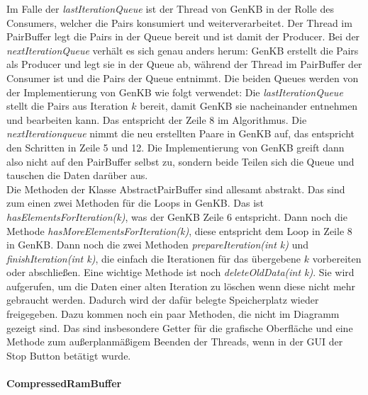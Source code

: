 \documentclass[12pt,a4paper]{article}
\begin{document}
Im Falle der \textit{lastIterationQueue} ist der Thread von GenKB in der Rolle des Consumers, welcher die Pairs konsumiert und weiterverarbeitet. Der Thread im PairBuffer legt die Pairs in der Queue bereit und ist damit der Producer. Bei der \textit{nextIterationQueue} verhält es sich genau anders herum: GenKB erstellt die Pairs als Producer und legt sie in der Queue ab, während der Thread im PairBuffer der Consumer ist und die Pairs der Queue entnimmt. Die beiden Queues werden von der Implementierung von GenKB wie folgt verwendet: Die \textit{lastIterationQueue} stellt die Pairs aus Iteration $k$ bereit, damit GenKB sie nacheinander entnehmen und bearbeiten kann. Das entspricht der Zeile 8 im Algorithmus. Die \textit{nextIterationqueue} nimmt die neu erstellten Paare in GenKB auf, das entspricht den Schritten in Zeile 5 und 12. Die Implementierung von GenKB greift dann also nicht auf den PairBuffer selbst zu, sondern beide Teilen sich die Queue und tauschen die Daten darüber aus. \\
Die Methoden der Klasse AbstractPairBuffer sind allesamt abstrakt. Das sind zum einen zwei Methoden für die Loops in GenKB. Das ist \textit{hasElementsForIteration(k)}, was der GenKB Zeile 6 entspricht. Dann noch die Methode \textit{hasMoreElementsForIteration(k)}, diese entspricht dem Loop in Zeile 8 in GenKB. Dann noch die zwei Methoden \textit{prepareIteration(int k)} und \textit{finishIteration(int k)}, die einfach die Iterationen für das übergebene $k$ vorbereiten oder abschließen. Eine wichtige Methode ist noch \textit{deleteOldData(int k)}. Sie wird aufgerufen, um die Daten einer alten Iteration zu löschen wenn diese nicht mehr gebraucht werden. Dadurch wird der dafür belegte Speicherplatz wieder freigegeben. Dazu kommen noch ein paar Methoden, die nicht im Diagramm gezeigt sind. Das sind insbesondere Getter für die grafische Oberfläche und eine Methode zum außerplanmäßigem Beenden der Threads, wenn in der GUI der Stop Button betätigt wurde.



\paragraph{CompressedRamBuffer}\mbox{}
\label{sec:compressedrambuffer}
\end{document}
